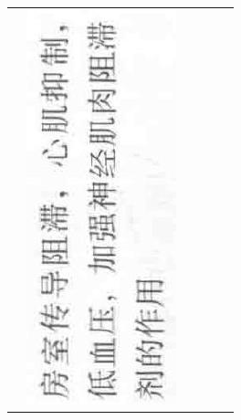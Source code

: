 \documentclass[10pt]{article}
\begin{document}
\begin{center}
\begin{tabular}{|c|c|c|c|c|c|}
 & \includegraphics[max width=\textwidth]{2024_07_05_645bb794a4d4f32ee0c8g-352(13)}

\end{tabular}
\end{center}
\end{document}
